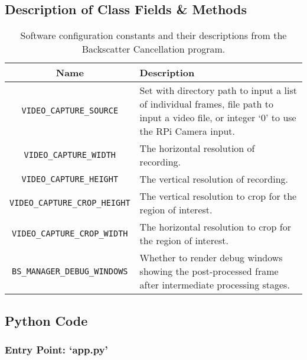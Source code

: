\subsection{Description of Class Fields \& Methods}
\label{sys_tbls}
\begin{table}[H]
    \centering
    \begin{tabularx}{\linewidth}{c | X}
        Name    &   Description\\
        \hline
        \hline
        \texttt{VIDEO\_CAPTURE\_SOURCE} & Set with directory path to input a list of individual frames, file path to input a video file, or integer `0' to use the RPi Camera input.\\
        \hline
        \texttt{VIDEO\_CAPTURE\_WIDTH} & The horizontal resolution of recording.\\
        \hline
        \texttt{VIDEO\_CAPTURE\_HEIGHT} & The vertical resolution of recording.\\
        \hline
        \texttt{VIDEO\_CAPTURE\_CROP\_HEIGHT} &  The vertical resolution to crop for the region of interest.\\
        \hline
        \texttt{VIDEO\_CAPTURE\_CROP\_WIDTH} &  The horizontal resolution to crop for the region of interest.\\
        \hline
        \texttt{BS\_MANAGER\_DEBUG\_WINDOWS} & Whether to render debug windows showing the post-processed frame after intermediate processing stages.\\
        \hline
    \end{tabularx}
    \caption{Software configuration constants and their descriptions from the Backscatter Cancellation program.}
    \label{table:sysparams}
\end{table}

\subsection{Python Code}
\label{sys_code}
\subsubsection{Entry Point: `app.py'}



